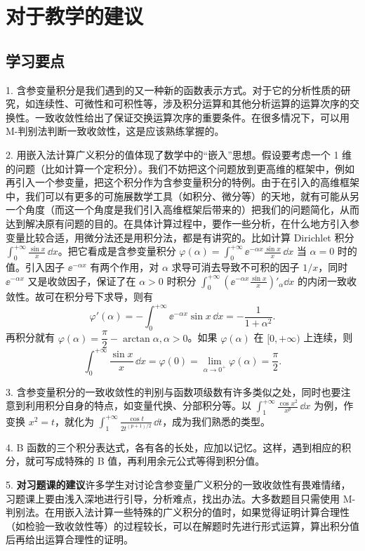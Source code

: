 \section{对于教学的建议}

\subsection{学习要点}

1. 含参变量积分是我们遇到的又一种新的函数表示方式。对于它的分析性质的研究，如连续性、可微性和可积性等，涉及积分运算和其他分析运算的运算次序的交换性。一致收敛性给出了保证交换运算次序的重要条件。在很多情况下，可以用 M-判别法判断一致收敛性，这是应该熟练掌握的。

2. 用嵌入法计算广义积分的值体现了数学中的“嵌入”思想。假设要考虑一个 1 维的问题（比如计算一个定积分）。我们不妨把这个问题放到更高维的框架中，例如再引入一个参变量，把这个积分作为含参变量积分的特例。由于在引入的高维框架中，我们可以有更多的可施展数学工具（如积分、微分等）的天地，就有可能从另一个角度（而这一个角度是我们引入高维框架后带来的）把我们的问题简化，从而达到解决原有问题的目的。在具体计算过程中，要作一些分析，在什么地方引入参变量比较合适，用微分法还是用积分法，都是有讲究的。比如计算 Dirichlet 积分 $\displaystyle\int_0^{+\infty}\frac{\sin x}{x}\,\dd x$。把它看成是含参变量积分 $\varphi(\alpha)=\displaystyle\int_0^{+\infty}\ee^{-\alpha x}\frac{\sin x}{x}\,\dd x$ 当 $\alpha=0$ 时的值。引入因子 $\ee^{-\alpha x}$ 有两个作用，对 $\alpha$ 求导可消去导致不可积的因子 $1/x$，同时 $\ee^{-\alpha x}$ 又是收敛因子，保证了在 $\alpha>0$ 时积分 $\displaystyle\int_0^{+\infty}\left(\ee^{-\alpha x}\frac{\sin x}{x}\right)'_\alpha\dd x$ 的内闭一致收敛性。故可在积分号下求导，则有
\[
  \varphi'(\alpha)=-\int_0^{+\infty}\ee^{-\alpha x}\sin x\,\dd x=-\frac1{1+\alpha^2}.
\]
再积分就有 $\varphi(\alpha)=\dfrac\pi2-\arctan\alpha,\alpha>0$。如果 $\varphi(\alpha)$ 在 $[0,+\infty)$ 上连续，则
\[
  \int_0^{+\infty}\frac{\sin x}{x}\,\dd x=\varphi(0)=\lim_{\alpha\to0^+}\varphi(\alpha)=\frac\pi2.
\]

3. 含参变量积分的一致收敛性的判别与函数项级数有许多类似之处，同时也要注意到利用积分自身的特点，如变量代换、分部积分等。以 $\displaystyle\int_1^{+\infty}\frac{\cos x^2}{x^p}\,\dd x$ 为例，作变换 $x^2=t$，就化为 $\displaystyle\int_1^{+\infty}\frac{\cos t}{2t^{(p+1)/2}}\,\dd t$，成为我们熟悉的类型。

4. B 函数的三个积分表达式，各有各的长处，应加以记忆。这样，遇到相应的积分，就可写成特殊的 B 值，再利用余元公式等得到积分值。

5. \textbf{对习题课的建议}\quad 许多学生对讨论含参变量广义积分的一致收敛性有畏难情绪，习题课上要由浅入深地进行引导，分析难点，找出办法。大多数题目只需使用 M-判别法。在用嵌入法计算一些特殊的广义积分的值时，如果觉得证明计算合理性（如检验一致收敛性等）的过程较长，可以在解题时先进行形式运算，算出积分值后再给出运算合理性的证明。

